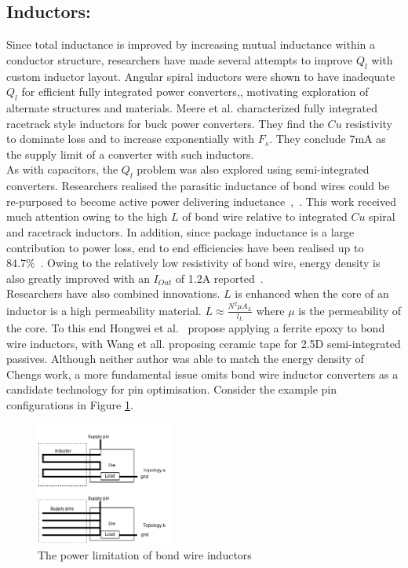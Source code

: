 \documentclass[letterpaper,twocolumn,10pt]{article}
\begin{document}
\subsection{Inductors: }Since total inductance is improved by increasing mutual inductance within a conductor structure, researchers have made several attempts to improve $Q_l$ with custom inductor layout. Angular spiral inductors were shown to have inadequate $Q_l$ for efficient fully integrated power converters\cite{Alimadadi2008},\cite{Artillan2011}, motivating exploration of alternate structures and materials. Meere et al. \cite{Meere2009} characterized fully integrated racetrack style inductors for buck power converters. They find the $Cu$ resistivity to dominate loss and to increase exponentially with $F_s$. They conclude 7mA as the supply limit of a converter with such inductors.\\
As with capacitors, the $Q_l$ problem was also explored using semi-integrated converters. Researchers realised the parasitic inductance of bond wires could be re-purposed to become active power delivering inductance~\cite{Wens2007},~\cite{Ahn2012}. This work received much attention owing to the high $L$ of bond wire relative to integrated $Cu$ spiral and racetrack inductors. In addition, since package inductance is a large contribution to power loss, end to end efficiencies have been realised up to 84.7\%~\cite{Cheng2013}. Owing to the relatively low resistivity of bond wire, energy density is also greatly improved with an $I_{Out}$ of 1.2A reported~\cite{Cheng2013}.\\
\indent Researchers have also combined innovations. $L$ is enhanced when the core of an inductor is a high permeability material. $L \approx \frac{N^2\mu A_L}{l_L}$ where $\mu$ is the permeability of the core. To this end Hongwei et al.~\cite{Hongwei2011} propose applying a ferrite epoxy to bond wire inductors, with Wang et all. proposing ceramic tape for 2.5D semi-integrated passives. Although neither author was able to match the energy density of Chengs work, a more fundamental issue omits bond wire inductor converters as a candidate technology for pin optimisation. Consider the example pin configurations in Figure \ref{BondWireLim}.
    
\begin{figure}[here]
\includegraphics[width=0.4\textwidth]{CostvsGainofBondWireInductor}
\caption{The power limitation of bond wire inductors}
\label{BondWireLim}
\end{figure}
\end{document}
